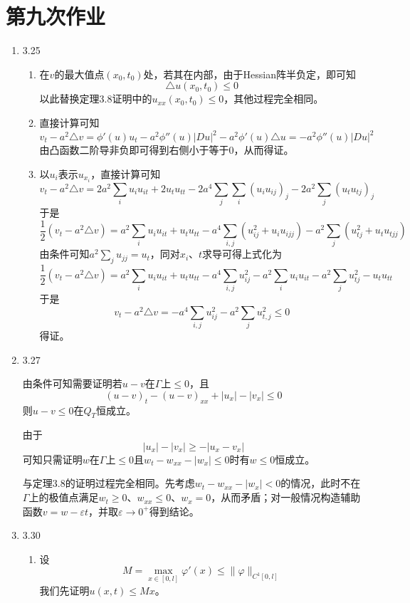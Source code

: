 \documentclass[a4paper,UTF8,fontset=windows,10pt]{ctexart}
\begin{document}
\section{第九次作业}
\begin{enumerate}
    \item 3.25
    \begin{enumerate}[(1)]
        \item 在$v$的最大值点$(x_0,t_0)$处，若其在内部，由于Hessian阵半负定，即可知
        $$\triangle u(x_0,t_0)\le 0$$
        以此替换定理3.8证明中的$u_{xx}(x_0,t_0)\le0$，其他过程完全相同。
    
        \item 直接计算可知
        $$v_t-a^2\triangle v=\phi'(u)u_t-a^2\phi''(u)|Du|^2-a^2\phi'(u)\triangle u=-a^2\phi''(u)|Du|^2$$
        由凸函数二阶导非负即可得到右侧小于等于0，从而得证。
    
        \item 以$u_i$表示$u_{x_i}$，直接计算可知
        $$v_t-a^2\triangle v=2a^2\sum_iu_iu_{it}+2u_tu_{tt}-2a^4\sum_j\sum_i(u_iu_{ij})_j-2a^2\sum_j(u_tu_{tj})_j$$
        于是
        $$\frac{1}{2}(v_t-a^2\triangle v)=a^2\sum_iu_iu_{it}+u_tu_{tt}-a^4\sum_{i,j}(u_{ij}^2+u_iu_{ijj})-a^2\sum_j(u_{tj}^2+u_tu_{tjj})$$
        由条件可知$a^2\sum_ju_{jj}=u_t$，同对$x_i$、$t$求导可得上式化为
        $$\frac{1}{2}(v_t-a^2\triangle v)=a^2\sum_iu_iu_{it}+u_tu_{tt}-a^4\sum_{i,j}u_{ij}^2-a^2\sum_iu_iu_{it}-a^2\sum_ju_{tj}^2-u_tu_{tt}$$
        于是
        $$v_t-a^2\triangle v=-a^4\sum_{i,j}u_{ij}^2-a^2\sum_ju_{t,j}^2\le0$$
        得证。
    \end{enumerate}
    
    \item 3.27
    
    由条件可知需要证明若$u-v$在$\Gamma$上$\le0$，且
    $$(u-v)_t-(u-v)_{xx}+|u_x|-|v_x|\le0$$
    则$u-v\le0$在$Q_T$恒成立。
    
    由于
    $$|u_x|-|v_x|\ge-|u_x-v_x|$$
    可知只需证明$w$在$\Gamma$上$\le0$且$w_t-w_{xx}-|w_x|\le0$时有$w\le0$恒成立。
    
    与定理3.8的证明过程完全相同。先考虑$w_t-w_{xx}-|w_x|<0$的情况，此时不在$\Gamma$上的极值点满足$w_t\ge0$、$w_{xx}\le0$、$w_x=0$，从而矛盾；对一般情况构造辅助函数$v=w-\varepsilon t$，并取$\varepsilon\to0^+$得到结论。
    
    \item 3.30
    \begin{enumerate}[(1)]
        \item 设
        $$M=\max_{x\in[0,l]}\varphi'(x)\le\|\varphi\|_{C^1[0,l]}$$
        我们先证明$u(x,t)\le Mx$。
    

\end{enumerate}
\end{enumerate}
\end{document}
